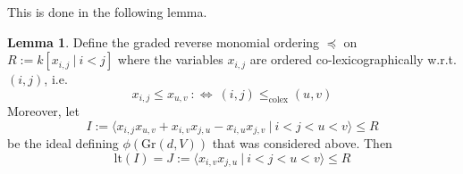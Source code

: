 \documentclass{scrartcl}
\newcommand{\Gr}{\mathrm{Gr}}
\theoremstyle{definition}
\newtheorem{lemma}[subsection]{Lemma}
\begin{document}
This is done in the following lemma.
\begin{lemma}
    \label{prop:leading_term_ideal_grassmanian}
    Define the graded reverse monomial ordering $\preceq$ on $R := k[x_{i, j} \ | \ i < j]$ where the variables $x_{i, j}$ are ordered co-lexicographically w.r.t. $(i, j)$, i.e.
    \begin{equation*}
        x_{i, j} \leq x_{u, v} \ :\Leftrightarrow \ (i, j) \leq_{\text{colex}} (u, v)
    \end{equation*}
    Moreover, let
    \begin{equation*}
        I := \langle x_{i, j}x_{u, v} + x_{i, v}x_{j, u} - x_{i, u}x_{j, v} \ | \ i < j < u < v \rangle \leq R
    \end{equation*}
    be the ideal defining $\phi(\Gr(d, V))$ that was considered above. Then
    \begin{equation*}
        \mathrm{lt}(I) = J := \langle x_{i, v} x_{j, u} \ | \ i < j < u < v \rangle \leq R
    \end{equation*}
\end{lemma}
\end{document}
